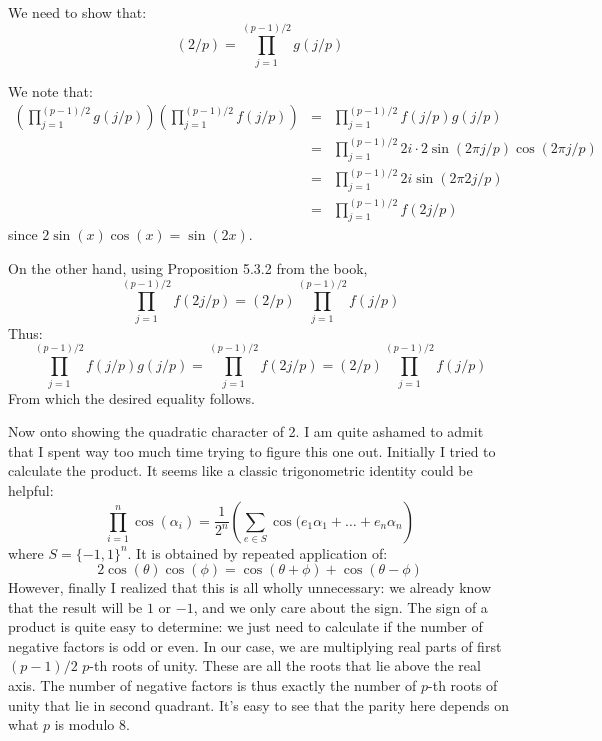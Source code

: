 \documentclass[notitlepage]{article}
\theoremstyle{definition}
\begin{document}
We need to show that:
\begin{equation}
(2/p) = \prod_{j=1}^{(p-1)/2} g(j/p)
\end{equation}

We note that:
\begin{eqnarray}
  \left(\prod_{j=1}^{(p-1)/2} g(j/p)\right)\left(\prod_{j=1}^{(p-1)/2} f(j/p)\right)
  &=& \prod_{j=1}^{(p-1)/2} f(j/p)g(j/p) \\
  &=& \prod_{j=1}^{(p-1)/2} 2i \cdot 2\sin(2 \pi j/p) \cos(2 \pi j/p) \\
  &=& \prod_{j=1}^{(p-1)/2} 2i \sin(2 \pi 2j/p) \\
  &=& \prod_{j=1}^{(p-1)/2} f(2j/p)
\end{eqnarray}
since $2 \sin(x) \cos(x) = \sin(2x)$.

On the other hand, using Proposition 5.3.2 from the book,
\begin{equation}
  \prod_{j=1}^{(p-1)/2} f(2j/p) = (2/p) \prod_{j=1}^{(p-1)/2} f(j/p)
\end{equation}
Thus:
\begin{equation}
  \prod_{j=1}^{(p-1)/2} f(j/p)g(j/p) = \prod_{j=1}^{(p-1)/2} f(2j/p) =
  (2/p) \prod_{j=1}^{(p-1)/2} f(j/p)
\end{equation}
From which the desired equality follows.

Now onto showing the quadratic character of 2. I am quite ashamed to
admit that I spent way too much time trying to figure this one
out. Initially I tried to calculate the product. It seems like a
classic trigonometric identity could be helpful:
\begin{equation}
\prod_{i = 1}^n \cos(\alpha_i) = \frac{1}{2^n}\left(\sum_{e \in S}
\cos(e_1 \alpha_1 + \ldots + e_n \alpha_n\right)
\end{equation}
where $S = \{-1, 1\}^n$. It is obtained by repeated application of:
\begin{equation}
  2 \cos(\theta)\cos(\phi) = \cos(\theta + \phi) + \cos(\theta - \phi)
\end{equation}
However, finally I realized that this is all wholly unnecessary: we
already know that the result will be $1$ or $-1$, and we only care
about the sign. The sign of a product is quite easy to determine: we
just need to calculate if the number of negative factors is odd or
even. In our case, we are multiplying real parts of first $(p-1)/2$
$p$-th roots of unity. These are all the roots that lie above the real
axis. The number of negative factors is thus exactly the number of
$p$-th roots of unity that lie in second quadrant. It's easy to see
that the parity here depends on what $p$ is modulo $8$.
\end{document}

